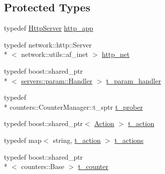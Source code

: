 \subsection*{Protected Types}
\begin{DoxyCompactItemize}
\item 
typedef \hyperlink{classxtd_1_1servers_1_1app_1_1HttpServer}{Http\-Server} \hyperlink{classxtd_1_1servers_1_1app_1_1HttpServer_ad879d72fb0151a3c383ccbe75bb642cc}{http\-\_\-app}
\item 
typedef network\-::http\-::\-Server\\*
$<$ network\-::utils\-::af\-\_\-inet $>$ \hyperlink{classxtd_1_1servers_1_1app_1_1HttpServer_ac5263de622bb17c3ec921a00266ea053}{http\-\_\-net}
\item 
typedef boost\-::shared\-\_\-ptr\\*
$<$ \hyperlink{classxtd_1_1servers_1_1param_1_1Handler}{servers\-::param\-::\-Handler} $>$ \hyperlink{classxtd_1_1servers_1_1app_1_1HttpServer_a9704ed4f011ec3a7424da2f2229477e1}{t\-\_\-param\-\_\-handler}
\item 
typedef \\*
counters\-::\-Counter\-Manager\-::t\-\_\-sptr \hyperlink{classxtd_1_1servers_1_1app_1_1HttpServer_ace89439f838ede46ec55a6ec7cc27888}{t\-\_\-prober}
\item 
typedef boost\-::shared\-\_\-ptr$<$ \hyperlink{classxtd_1_1servers_1_1app_1_1Action}{Action} $>$ \hyperlink{classxtd_1_1servers_1_1app_1_1HttpServer_a1353c6e9098dd5f8a74d978a7049ad27}{t\-\_\-action}
\item 
typedef map$<$ string, \hyperlink{classxtd_1_1servers_1_1app_1_1HttpServer_a1353c6e9098dd5f8a74d978a7049ad27}{t\-\_\-action} $>$ \hyperlink{classxtd_1_1servers_1_1app_1_1HttpServer_ac61c9a29bf64b94cb8ca4c766f8309c3}{t\-\_\-actions}
\item 
typedef boost\-::shared\-\_\-ptr\\*
$<$ counters\-::\-Base $>$ \hyperlink{classxtd_1_1servers_1_1app_1_1HttpServer_aaef467afe1f5191f38758088615c09c0}{t\-\_\-counter}
\end{DoxyCompactItemize}
